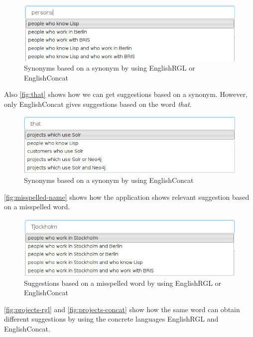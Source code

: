 \begin{figure}[H]
\includegraphics[scale=0.6,keepaspectratio,valign=t]{./gfx/persons.png}
\caption{Synonyms based on a synonym by using EnglishRGL or EnglishConcat\label{fig:persons}}
\end{figure}

Also \autoref{fig:that} shows how we can get suggestions based on a synonym. However, only EnglishConcat gives suggestions based on the word \emph{that}.

\begin{figure}[H]
\includegraphics[scale=0.6,keepaspectratio,valign=t]{./gfx/that.png}
\caption{Synonyms based on a synonym by using EnglishConcat\label{fig:that}}
\end{figure}

\autoref{fig:misspelled-name} shows how the application shows relevant suggestion based on a misspelled word.

\begin{figure}[H]
\includegraphics[scale=0.6,keepaspectratio,valign=t]{./gfx/misspelled_name.png}
\caption{Suggestions based on a misspelled word by using EnglishRGL or EnglishConcat\label{fig:misspelled-name}}
\end{figure}

\autoref{fig:projects-rgl} and \autoref{fig:projects-concat} show how the same word can obtain different suggestions by using the concrete languages EnglishRGL and EnglishConcat.


